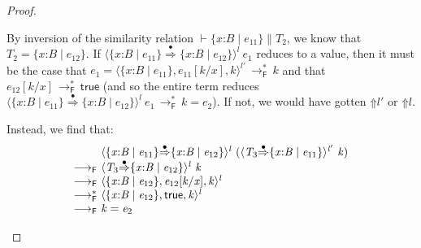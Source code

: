 \documentclass[9pt]{extarticle}
\newcommand{\ottnt}[1]{\mathit{#1}}
\newcommand{\ottsym}[1]{#1}
\begin{document}
{\begin{lemma}
\begin{proof}
{\begin{itemize}
      By inversion of the similarity relation $\vdash   \{ \mathit{x} \mathord{:} \ottnt{B} \mathrel{\mid} \ottnt{e_{{\mathrm{11}}}} \}   \mathrel{\parallel}  \ottnt{T_{{\mathrm{2}}}}$, we know that $\ottnt{T_{{\mathrm{2}}}}  \ottsym{=}   \{ \mathit{x} \mathord{:} \ottnt{B} \mathrel{\mid} \ottnt{e_{{\mathrm{12}}}} \} $.
If $ \langle   \{ \mathit{x} \mathord{:} \ottnt{B} \mathrel{\mid} \ottnt{e_{{\mathrm{11}}}} \}   \mathord{ \overset{\bullet}{\Rightarrow} }   \{ \mathit{x} \mathord{:} \ottnt{B} \mathrel{\mid} \ottnt{e_{{\mathrm{12}}}} \}   \rangle^{ \ottnt{l} } ~  \ottnt{e_{{\mathrm{1}}}} $ reduces to a value, then it
      must be the case that $ \ottnt{e_{{\mathrm{1}}}}  \mathrel{=}   \langle   \{ \mathit{x} \mathord{:} \ottnt{B} \mathrel{\mid} \ottnt{e_{{\mathrm{11}}}} \}  ,   \ottnt{e_{{\mathrm{11}}}}  [  \ottnt{k} / \mathit{x}  ]  ,  \ottnt{k}  \rangle^{ \ottnt{l'} }   \,  \longrightarrow ^{*}_{  \mathsf{F}  }  \, \ottnt{k}$ and that $ \ottnt{e_{{\mathrm{12}}}}  [  \ottnt{k} / \mathit{x}  ]  \,  \longrightarrow ^{*}_{  \mathsf{F}  }  \,  \mathsf{true} $ (and so the entire term
      reduces $ \langle   \{ \mathit{x} \mathord{:} \ottnt{B} \mathrel{\mid} \ottnt{e_{{\mathrm{11}}}} \}   \mathord{ \overset{\bullet}{\Rightarrow} }   \{ \mathit{x} \mathord{:} \ottnt{B} \mathrel{\mid} \ottnt{e_{{\mathrm{12}}}} \}   \rangle^{ \ottnt{l} } ~  \ottnt{e_{{\mathrm{1}}}}  \,  \longrightarrow ^{*}_{  \mathsf{F}  }  \, \ottnt{k} = \ottnt{e_{{\mathrm{2}}}}$). If not, we
      would have gotten $ \mathord{\Uparrow}  \ottnt{l'} $ or $ \mathord{\Uparrow}  \ottnt{l} $.
      
      Instead, we find that: 
      \[ \begin{array}{r@{~}l}
        &  \langle   \{ \mathit{x} \mathord{:} \ottnt{B} \mathrel{\mid} \ottnt{e_{{\mathrm{11}}}} \}   \mathord{ \overset{\bullet}{\Rightarrow} }   \{ \mathit{x} \mathord{:} \ottnt{B} \mathrel{\mid} \ottnt{e_{{\mathrm{12}}}} \}   \rangle^{ \ottnt{l} } ~   (  \langle  \ottnt{T_{{\mathrm{3}}}}  \mathord{ \overset{\bullet}{\Rightarrow} }   \{ \mathit{x} \mathord{:} \ottnt{B} \mathrel{\mid} \ottnt{e_{{\mathrm{11}}}} \}   \rangle^{ \ottnt{l'} } ~  \ottnt{k}  )    \\
         \longrightarrow _{  \mathsf{F}  } &  \langle  \ottnt{T_{{\mathrm{3}}}}  \mathord{ \overset{\bullet}{\Rightarrow} }   \{ \mathit{x} \mathord{:} \ottnt{B} \mathrel{\mid} \ottnt{e_{{\mathrm{12}}}} \}   \rangle^{ \ottnt{l} } ~  \ottnt{k}  \\
         \longrightarrow _{  \mathsf{F}  } &  \langle   \{ \mathit{x} \mathord{:} \ottnt{B} \mathrel{\mid} \ottnt{e_{{\mathrm{12}}}} \}  ,   \ottnt{e_{{\mathrm{12}}}}  [  \ottnt{k} / \mathit{x}  ]  ,  \ottnt{k}  \rangle^{ \ottnt{l} }  \\
         \longrightarrow ^{*}_{  \mathsf{F}  } &  \langle   \{ \mathit{x} \mathord{:} \ottnt{B} \mathrel{\mid} \ottnt{e_{{\mathrm{12}}}} \}  ,   \mathsf{true}  ,  \ottnt{k}  \rangle^{ \ottnt{l} }  \\
         \longrightarrow _{  \mathsf{F}  } & \ottnt{k}  \ottsym{=}  \ottnt{e_{{\mathrm{2}}}}
      \end{array} \]
      

\end{itemize}}
\end{proof}
\end{lemma}}
\end{document}
